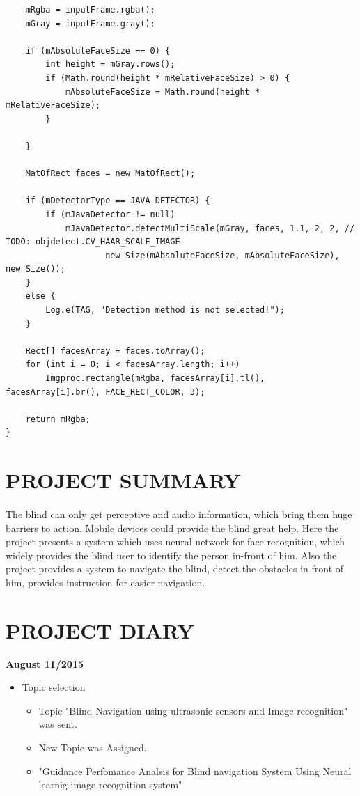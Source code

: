 \documentclass[10pt,a4paper,twoside]{report}
\begin{document}
\begin{appendix}
\begin{flushleft}
\begin{tiny}
\begin{lstlisting}
    mRgba = inputFrame.rgba();
    mGray = inputFrame.gray();

    if (mAbsoluteFaceSize == 0) {
        int height = mGray.rows();
        if (Math.round(height * mRelativeFaceSize) > 0) {
            mAbsoluteFaceSize = Math.round(height * mRelativeFaceSize);
        }

    }

    MatOfRect faces = new MatOfRect();

    if (mDetectorType == JAVA_DETECTOR) {
        if (mJavaDetector != null)
            mJavaDetector.detectMultiScale(mGray, faces, 1.1, 2, 2, // TODO: objdetect.CV_HAAR_SCALE_IMAGE
                    new Size(mAbsoluteFaceSize, mAbsoluteFaceSize), new Size());
    }
    else {
        Log.e(TAG, "Detection method is not selected!");
    }

    Rect[] facesArray = faces.toArray();
    for (int i = 0; i < facesArray.length; i++)
        Imgproc.rectangle(mRgba, facesArray[i].tl(), facesArray[i].br(), FACE_RECT_COLOR, 3);

    return mRgba;
}

\end{lstlisting}
\end{tiny}
\end{flushleft}

\section{PROJECT SUMMARY}
\paragraph{ }The blind can only get perceptive and audio information, which bring them huge barriers to action. Mobile devices could provide the blind great help.
Here the project presents a system which uses neural network for face recognition, which widely provides the blind user to identify the person in-front of him. Also the  project provides a system to navigate the blind, detect the obstacles in-front of him, provides instruction for easier navigation.

\section{PROJECT DIARY}
\begin{flushleft}

\textbf{August 11/2015}\\
\begin{itemize}
\item Topic selection
\begin{itemize}
\item Topic "Blind Navigation using ultrasonic sensors and Image recognition" was sent.
\item New Topic was Assigned.
\item "Guidance Perfomance Analsis for Blind navigation System Using Neural learnig image recognition system"


\end{itemize}
\end{itemize}
\end{flushleft}
\end{appendix}
\end{document}
